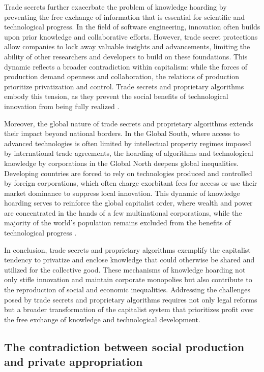 \begin{refsection}
Trade secrets further exacerbate the problem of knowledge hoarding by preventing the free exchange of information that is essential for scientific and technological progress. In the field of software engineering, innovation often builds upon prior knowledge and collaborative efforts. However, trade secret protections allow companies to lock away valuable insights and advancements, limiting the ability of other researchers and developers to build on these foundations. This dynamic reflects a broader contradiction within capitalism: while the forces of production demand openness and collaboration, the relations of production prioritize privatization and control. Trade secrets and proprietary algorithms embody this tension, as they prevent the social benefits of technological innovation from being fully realized \cite[pp.~45-47]{bessen2014}.

Moreover, the global nature of trade secrets and proprietary algorithms extends their impact beyond national borders. In the Global South, where access to advanced technologies is often limited by intellectual property regimes imposed by international trade agreements, the hoarding of algorithms and technological knowledge by corporations in the Global North deepens global inequalities. Developing countries are forced to rely on technologies produced and controlled by foreign corporations, which often charge exorbitant fees for access or use their market dominance to suppress local innovation. This dynamic of knowledge hoarding serves to reinforce the global capitalist order, where wealth and power are concentrated in the hands of a few multinational corporations, while the majority of the world’s population remains excluded from the benefits of technological progress \cite[pp.~30-33]{may2010}.

In conclusion, trade secrets and proprietary algorithms exemplify the capitalist tendency to privatize and enclose knowledge that could otherwise be shared and utilized for the collective good. These mechanisms of knowledge hoarding not only stifle innovation and maintain corporate monopolies but also contribute to the reproduction of social and economic inequalities. Addressing the challenges posed by trade secrets and proprietary algorithms requires not only legal reforms but a broader transformation of the capitalist system that prioritizes profit over the free exchange of knowledge and technological development.

\subsection{The contradiction between social production and private appropriation}


\end{refsection}
